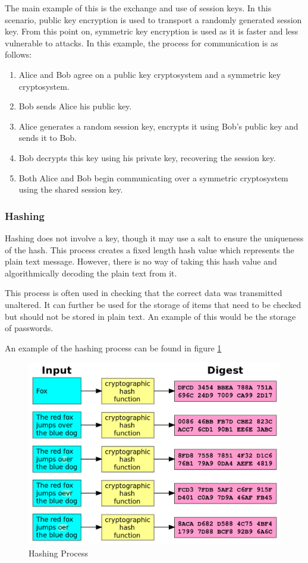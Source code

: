 				The main example of this is the exchange and use of session keys. 
				In this scenario, public key encryption is used to transport a randomly generated session key. 
				From this point on, symmetric key encryption is used as it is faster and less vulnerable to attacks. 
				In this example, the process for communication is as follows:
				\begin{enumerate}
					\item Alice and Bob agree on a public key cryptosystem and a symmetric key cryptosystem. 
					\item Bob sends Alice his public key. 
					\item Alice generates a random session key, encrypts it using Bob's public key and sends it to Bob. 
					\item Bob decrypts this key using his private key, recovering the session key. 
					\item Both Alice and Bob begin communicating over a symmetric cryptosystem using the shared session key. 
				\end{enumerate}
				
			\subsubsection{Hashing}
				Hashing does not involve a key, though it may use a salt to ensure the uniqueness of the hash. 
				This process creates a fixed length hash value which represents the plain text message. 
				However, there is no way of taking this hash value and algorithmically decoding the plain text from it. 

				This process is often used in checking that the correct data was transmitted unaltered. 
				It can further be used for the storage of items that need to be checked but should not be stored in plain text. 
				An example of this would be the storage of passwords. 
				
				An example of the hashing process can be found in figure \ref{fig:HashingProcess}
				\begin{figure}[htb]
					\centering
					\includegraphics[scale=0.25]{./HashProcess.png}
					\caption{Hashing Process}
					\label{fig:HashingProcess}
				\end{figure}

